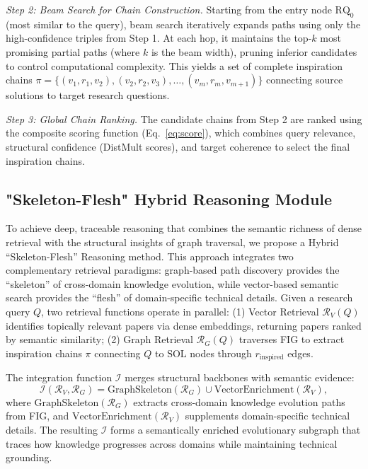 \documentclass[runningheads]{llncs}
\begin{document}
\textit{Step 2: Beam Search for Chain Construction.} Starting from the entry node $\text{RQ}_0$ (most similar to the query), beam search iteratively expands paths using only the high-confidence triples from Step 1. At each hop, it maintains the top-$k$ most promising partial paths (where $k$ is the beam width), pruning inferior candidates to control computational complexity. This yields a set of complete inspiration chains $\pi = \{(v_1, r_1, v_2), (v_2, r_2, v_3), \ldots, (v_m, r_m, v_{m+1})\}$ connecting source solutions to target research questions.

\textit{Step 3: Global Chain Ranking.} The candidate chains from Step 2 are ranked using the composite scoring function (Eq.~\ref{eq:score}), which combines query relevance, structural confidence (DistMult scores), and target coherence to select the final inspiration chains.

\subsection{"Skeleton-Flesh" Hybrid Reasoning Module}
\label{sec:hybrid_reasoning}

To achieve deep, traceable reasoning that combines the semantic richness of dense retrieval with the structural insights of graph traversal, we propose a Hybrid ``Skeleton-Flesh'' Reasoning method. This approach integrates two complementary retrieval paradigms: graph-based path discovery provides the ``skeleton'' of cross-domain knowledge evolution, while vector-based semantic search provides the ``flesh'' of domain-specific technical details. Given a research query $Q$, two retrieval functions operate in parallel: (1) Vector Retrieval $\mathcal{R}_V(Q)$ identifies topically relevant papers via dense embeddings, returning papers ranked by semantic similarity; (2) Graph Retrieval $\mathcal{R}_G(Q)$ traverses FIG to extract inspiration chains $\pi$ connecting $Q$ to $\text{SOL}$ nodes through $r_{\text{inspired}}$ edges.

The integration function $\mathcal{I}$ merges structural backbones with semantic evidence:
\begin{equation}
    \mathcal{I}(\mathcal{R}_V, \mathcal{R}_G) = \text{GraphSkeleton}(\mathcal{R}_G) \cup \text{VectorEnrichment}(\mathcal{R}_V),
\end{equation}
where $\text{GraphSkeleton}(\mathcal{R}_G)$ extracts cross-domain knowledge evolution paths from FIG, and $\text{VectorEnrichment}(\mathcal{R}_V)$ supplements domain-specific technical details. The resulting $\mathcal{I}$ forms a semantically enriched evolutionary subgraph that traces how knowledge progresses across domains while maintaining technical grounding.
\end{document}
